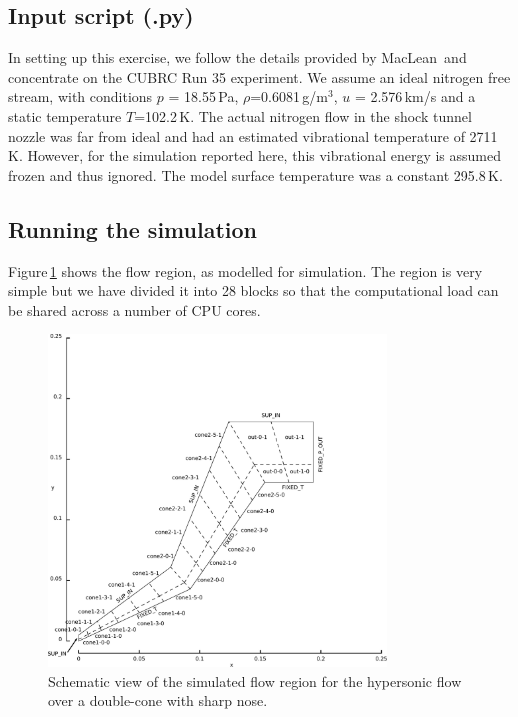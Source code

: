 \bigskip
\subsection{Input script (.py)}
%
In setting up this exercise, we follow the details provided by MacLean\,\cite{maclean_holden_2004a}
and concentrate on the CUBRC Run 35 experiment.
We assume an ideal nitrogen free stream, with conditions 
$p$ = 18.55\,Pa, $\rho$=0.6081\,g/m$^3$, $u$ = 2.576\,km/s and a static temperature $T$=102.2\,K.
The actual nitrogen flow in the shock tunnel nozzle was far from ideal and had an estimated
vibrational temperature of 2711\,K.
However, for the simulation reported here, this vibrational energy is assumed frozen and thus ignored.
The model surface temperature was a constant 295.8\,K.

\noindent
\topbar

\bottombar


\bigskip
\subsection{Running the simulation}
%
Figure\,\ref{fig:double-cone-sharp-nose-geometry} shows the flow region, as modelled for simulation.
The region is very simple but we have divided it into 28 blocks so that the computational load 
can be shared across a number of CPU cores.

\begin{figure}[htbp]
 \centering
 \includegraphics[width=0.8\textwidth,viewport=0 0 430 419,clip=true]{../2D/double-cone-sharp-nose/dbl-cone-edited.pdf}
 \caption{Schematic view of the simulated flow region for the hypersonic flow
          over a double-cone with sharp nose.}
 \label{fig:double-cone-sharp-nose-geometry}
\end{figure}

